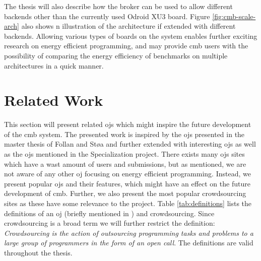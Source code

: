 The thesis will also describe how the broker can be used to allow different backends other than the currently used Odroid XU3 board. Figure \ref{fig:cmb-scale-arch} also shows n illustration of the architecture if extended with different backends. Allowing various types of boards on the system enables further exciting research on energy efficient programming, and may provide \gls{cmb} users with the possibility of comparing the energy efficiency of benchmarks on multiple architectures in a quick manner.

\section{Related Work}
\label{sec:related}
This section will present related \glspl{oj} which might inspire the future development of the \gls{cmb} system. The presented work is inspired by the \glspl{oj} presented in the master thesis of Follan and Støa and further extended with interesting \glspl{oj} as well as the \glspl{oj} mentioned in the Specialization project. There exists many \glspl{oj} sites which have a wast amount of users and submissions, but as mentioned, we are not aware of any other \gls{oj} focusing on energy efficient programming. Instead, we present popular \glspl{oj} and their features, which might have an effect on the future development of \gls{cmb}. Further, we also present the most popular crowdsourcing sites as these have some relevance to the project. Table \ref{tab:definitions} lists the definitions of an \gls{oj} (briefly mentioned in ) and crowdsourcing. Since crowdsourcing is a broad term we will further restrict the definition: \textit{Crowdsourcing is the action of outsourcing programming tasks and problems to a large group of programmers in the form of an open call}. The definitions are valid throughout the thesis. \\

